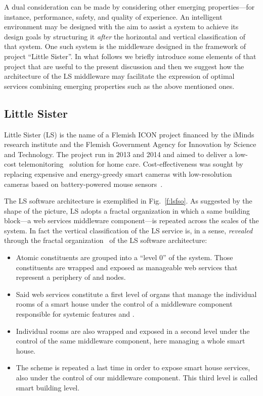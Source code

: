 \documentclass[twocolumn]{svjour3}
\def\M{\hbox{}}
\def\A{\hbox{}}
\def\P{\hbox{}}
\def\E{\hbox{}}
\begin{document}
A dual consideration can be made by considering other emerging properties---for instance,
performance, safety, and quality of experience. An intelligent environment may be designed with the aim to 
assist a system to achieve its design goals by structuring it \emph{after\/} the horizontal and vertical
classification of that system. One such system is the middleware designed in the framework
of project ``Little Sister''. In what follows
we briefly introduce some elements of that project that are useful to the present discussion
and then
we suggest how the architecture of the LS middleware may facilitate the expression of
optimal services combining emerging properties such as the above mentioned ones.

\subsection{Little Sister}\label{s:LS}
Little Sister (LS) is the name of a Flemish ICON project financed by
the iMinds research institute and the Flemish Government Agency for Innovation by
Science and Technology. The project run in 2013 and 2014 and aimed to deliver a
low-cost telemonitoring~\cite{Meystre05} solution for home care.
Cost-effectiveness was sought by replacing expensive and energy-greedy smart cameras
with low-resolution cameras
based on battery-powered mouse sensors~\cite{IGO}.



The LS software architecture is exemplified in Fig.~\ref{f:lsfso}. As suggested by the shape
of the picture, LS adopts a fractal organization
in which a same building block---a web services middleware component---is repeated across
the scales of the system. In fact the vertical classification of the LS service is, in a sense,
\emph{revealed\/} through the fractal organization~\cite{Koe67,Warnecke93,Tharu96,TWN1998}
of the LS software architecture:
\begin{itemize}
\item Atomic constituents are grouped into a ``level 0'' of the system. Those constituents are
wrapped and exposed as manageable web services that represent a periphery of \M{} and \E{} nodes.
\item Said web services constitute
a first level of organs that manage the individual rooms of a smart house under the control
of a middleware component responsible for systemic features \A{} and \P.
\item Individual rooms are also wrapped and exposed in a second level under the control of
the same middleware component, here managing a whole smart house.
\item The scheme is repeated a last time in order to expose smart house services, also
under the control of our middleware component. This third level is called smart building level.
\end{itemize}
\end{document}
